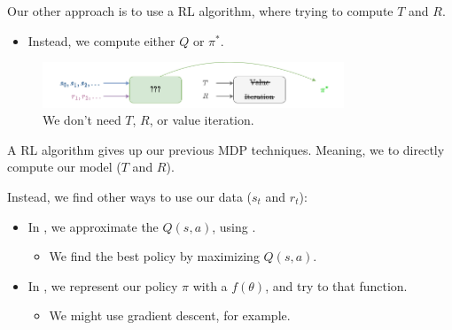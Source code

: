         Our other approach is to use a  RL algorithm, where  trying to compute $T$ and $R$.
        
            \begin{itemize}
                \item Instead, we  compute either $Q$ or $\pi^*$.
            \end{itemize}

        \begin{figure}[H]
            \centering
            \includegraphics[width=90mm,scale=0.5]{images/rl_images/model_free.png}
            \caption*{We don't need $T$, $R$, or value iteration.}
        \end{figure}

        \begin{definition}
            A  RL algorithm gives up our previous MDP techniques. Meaning, we  to directly compute our model ($T$ and $R$).

            Instead, we find other ways to use our data ($s_t$ and $r_t$):

            \begin{itemize}
                \item In , we approximate the  $Q(s,a)$, using .
                    \begin{itemize}
                        \item We find the best policy by maximizing $Q(s,a)$.
                    \end{itemize}

                \item In , we represent our policy $\pi$ with a  $f(\theta)$, and try to  that function.
                    \begin{itemize}
                        \item We might use gradient descent, for example.
                    \end{itemize}
            \end{itemize}
        \end{definition}

